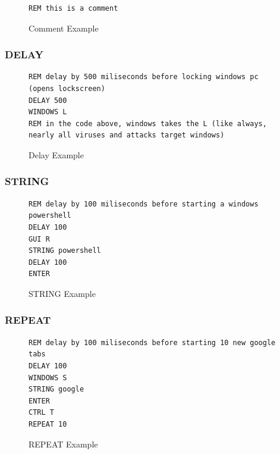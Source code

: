 \documentclass[a4paper,12pt]{article}
\begin{document}
\begin{figure}[htb]
\begin{small}
\begin{lstlisting}[language=Ducky]
REM this is a comment
\end{lstlisting}
\end{small}
\caption{Comment Example}
\end{figure}

\subsubsection{DELAY}

\begin{figure}[htb]
\begin{small}
\begin{lstlisting}[language=Ducky]
REM delay by 500 miliseconds before locking windows pc (opens lockscreen)
DELAY 500
WINDOWS L
REM in the code above, windows takes the L (like always, nearly all viruses and attacks target windows)
\end{lstlisting}
\end{small}
\caption{Delay Example}
\end{figure}

\newpage

\subsubsection{STRING}

\begin{figure}[htb]
\begin{small}
\begin{lstlisting}[language=Ducky]
REM delay by 100 miliseconds before starting a windows powershell
DELAY 100
GUI R
STRING powershell
DELAY 100
ENTER
\end{lstlisting}
\end{small}
\caption{STRING Example}
\end{figure}

\subsubsection{REPEAT}

\begin{figure}[htb]
\begin{small}
\begin{lstlisting}[language=Ducky]
REM delay by 100 miliseconds before starting 10 new google tabs
DELAY 100
WINDOWS S
STRING google
ENTER
CTRL T
REPEAT 10
\end{lstlisting}
\end{small}
\caption{REPEAT Example}
\end{figure}
\end{document}
